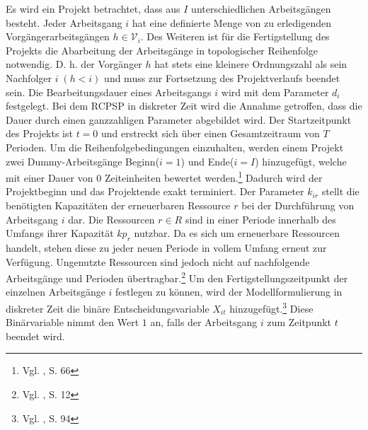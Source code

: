 \documentclass[a4paper,12pt,parskip,bibtotoc,liststotoc]{article}
\begin{document}
Es wird ein Projekt betrachtet, dass aus $I$ unterschiedlichen Arbeitsgängen besteht. Jeder Arbeitsgang $i$ hat eine definierte Menge von zu erledigenden Vorgängerarbeitsgängen $h \in \mathcal{V}_{i}$. Des Weiteren ist für die Fertigstellung des Projekts die Abarbeitung der Arbeitsgänge in topologischer Reihenfolge notwendig. D. h. der Vorgänger $h$ hat stets eine kleinere Ordnungszahl als sein Nachfolger $i\;(h<i)$ und muss zur Fortsetzung des Projektverlaufs beendet sein. Die Bearbeitungsdauer eines Arbeitsgangs $i$ wird mit dem Parameter $d_{i}$ festgelegt.  Bei dem RCPSP in diskreter Zeit wird die Annahme getroffen, dass die Dauer durch einen ganzzahligen Parameter abgebildet wird. Der Startzeitpunkt des Projekts ist $t = 0$ und erstreckt sich über einen Gesamtzeitraum von $T$ Perioden. Um die Reihenfolgebedingungen einzuhalten, werden einem Projekt zwei Dummy-Arbeitsgänge \glqq Beginn\grqq\;($i=1$) und \glqq Ende\grqq\;($i=I$) hinzugefügt, welche mit einer Dauer von $0$ Zeiteinheiten bewertet werden.\footnote{Vgl. \cite{zimmermann2006projektplanung}, S. 66} Dadurch wird der Projektbeginn und das Projektende exakt terminiert. Der Parameter $k_{ir}$ stellt die benötigten Kapazitäten der erneuerbaren Ressource $r$ bei der Durchführung von Arbeitsgang $i$ dar. Die Ressourcen $r \in R$ sind in einer Periode innerhalb des Umfangs ihrer Kapazität $kp_{r}$ nutzbar. Da es sich um erneuerbare Ressourcen handelt, stehen diese zu jeder neuen Periode in vollem Umfang erneut zur Verfügung. Ungenutzte Ressourcen sind jedoch nicht auf nachfolgende Arbeitsgänge und Perioden übertragbar.\footnote{Vgl. \cite{kellenbrink2014einfuhrung}, S. 12} Um den Fertigstellungszeitpunkt der einzelnen Arbeitsgänge $i$ festlegen zu können, wird der Modellformulierung in diskreter Zeit die binäre Entscheidungsvariable $X_{it}$ hinzugefügt.\footnote{Vgl. \cite{pritsker1969multiproject}, S. 94} Diese Binärvariable nimmt den Wert $1$ an, falls der Arbeitsgang $i$ zum Zeitpunkt $t$ beendet wird.\\
\end{document}
